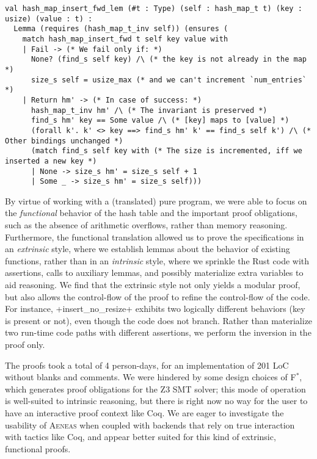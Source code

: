 \documentclass[acmsmall,screen]{acmart}
\newcommand{\aeneas}{\textsc{Aeneas}\xspace}
\newcommand{\fstar}{F$^\ast$\xspace}
\begin{document}
\begin{verbatim}
val hash_map_insert_fwd_lem (#t : Type) (self : hash_map_t t) (key : usize) (value : t) :
  Lemma (requires (hash_map_t_inv self)) (ensures (
    match hash_map_insert_fwd t self key value with
    | Fail -> (* We fail only if: *)
      None? (find_s self key) /\ (* the key is not already in the map *)
      size_s self = usize_max (* and we can't increment `num_entries` *)
    | Return hm' -> (* In case of success: *)
      hash_map_t_inv hm' /\ (* The invariant is preserved *)
      find_s hm' key == Some value /\ (* [key] maps to [value] *)
      (forall k'. k' <> key ==> find_s hm' k' == find_s self k') /\ (* Other bindings unchanged *)
      (match find_s self key with (* The size is incremented, iff we inserted a new key *)
      | None -> size_s hm' = size_s self + 1
      | Some _ -> size_s hm' = size_s self)))
\end{verbatim}

By virtue of working with a (translated) pure program, we were able to focus on the
\emph{functional} behavior of the hash table and the important proof obligations,
such as the absence of arithmetic overflows, rather than memory reasoning.
Furthermore, the functional translation allowed us to prove the specifications
in an \emph{extrinsic} style, where we establish lemmas about the behavior of
existing functions, rather than in an
\emph{intrinsic} style, where we sprinkle the Rust code with assertions, calls
to auxiliary lemmas, and possibly materialize extra variables to aid
reasoning. We find that the extrinsic style not only yields a modular proof, but
also allows the control-flow of the proof to
refine the control-flow of the code. For instance, \li+insert_no_resize+
exhibits two logically different behaviors (key is present or not), even
though the code does not branch. Rather than materialize two
run-time code paths with different assertions, we perform the inversion
in the proof only.

The proofs took a total of 4 person-days, for an implementation of 201 LoC
without blanks and comments. We were hindered by some design choices of \fstar,
which generates proof obligations for the Z3 SMT solver; this mode of operation is
well-suited to intrinsic reasoning, but there is right now no way for the user
to have an interactive proof context like Coq. We are eager to investigate the
usability of \aeneas when coupled with backends that rely on
true interaction with tactics like Coq, and appear better suited for this
kind of extrinsic, functional proofs.
\end{document}
